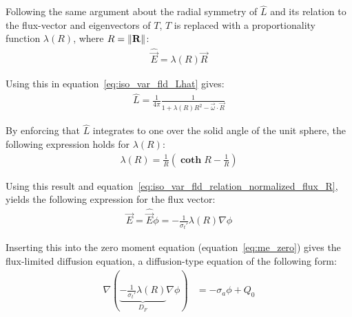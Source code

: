 Following the same argument about the radial symmetry of $\hat{L}$ and its relation to the flux-vector and eigenvectors of $T$, $T$ is replaced with a proportionality function $\lambda(R)$, where $R=\left\lVert\boldsymbol{\mathbf{R}}\right\rVert$:
\begin{align}
\widehat{\vec{E}} = \lambda(R)\vec{R}
\label{eq:iso_var_fld_relation_normalized_flux_R}
\end{align}

Using this in equation~\ref{eq:iso_var_fld_Lhat} gives:
\begin{align}
\label{eq:iso_var_fld_Lhat_R}
\hat{L} = \frac{1}{4\pi}\frac{1}{1+\lambda(R)R^2-\vec{\omega}\cdot\vec{R}}
\end{align}

By enforcing that $\hat{L}$ integrates to one over the solid angle of the unit sphere, the following expression holds for $\lambda(R)$:
\begin{align}
\label{eq:iso_var_fld_lambdaR}
\lambda(R) = \frac{1}{R}\left(\mathbf{\operatorname{coth}}R - \frac{1}{R}\right)
\end{align}

Using this result and equation~\ref{eq:iso_var_fld_relation_normalized_flux_R}, yields the following expression for the flux vector:
\begin{align}
\label{eq:iso_var_fld_fluxvector}
\vec{E} = \widehat{\vec{E}}\phi=-\frac{1}{\sigma_t'}\lambda(R)\nabla\phi
\end{align}

Inserting this into the zero moment equation (equation~\ref{eq:me_zero}) gives the flux-limited diffusion equation, a diffusion-type equation of the following form:
\begin{align}
\label{eq:iso_var_fld_final}
\nabla\left( \underbrace{-\frac{1}{\sigma_t'}\lambda(R)}_{D_F}\nabla\phi\right) &= -\sigma_a\phi + Q_0
\end{align}


